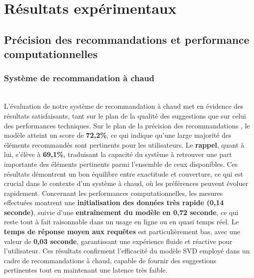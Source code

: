 \documentclass{article}
\begin{document}
\section{Résultats expérimentaux}

\subsection{Précision des recommandations et performance computationnelles}

\subsubsection{Système de recommandation à chaud}
$ $\\
L’évaluation de notre système de recommandation à chaud met en évidence des résultats satisfaisants, tant sur le plan de la qualité des suggestions que sur celui des performances techniques.
Sur le plan de la précision des recommandations , le modèle atteint un score de \textbf{72,2\%}, ce qui indique qu’une large majorité des éléments recommandés sont pertinents pour les utilisateurs. Le \textbf{rappel}, quant à lui, s’élève à \textbf{69,1\%}, traduisant la capacité du système à retrouver une part importante des éléments pertinents parmi l’ensemble de ceux disponibles. Ces résultats démontrent un bon équilibre entre exactitude et couverture, ce qui est crucial dans le contexte d’un système à chaud, où les préférences peuvent évoluer rapidement.
Concernant les performances computationnelles, les mesures effectuées montrent une \textbf{initialisation des données très rapide (0,14 seconde)}, suivie d’une \textbf{entraînement du modèle en 0,72 seconde}, ce qui reste tout à fait raisonnable dans un usage en ligne ou en quasi temps réel. Le \textbf{temps de réponse moyen aux requêtes} est particulièrement bas, avec une valeur de \textbf{0,03 seconde}, garantissant une expérience fluide et réactive pour l’utilisateur.
Ces résultats confirment l’efficacité du modèle SVD employé dans un cadre de recommandations à chaud, capable de fournir des suggestions pertinentes tout en maintenant une latence très faible.
\end{document}
